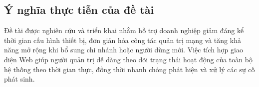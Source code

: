 \subsection{Ý nghĩa thực tiễn của đề tài}
Đề tài được nghiên cứu và triển khai nhằm hỗ trợ doanh nghiệp giảm đáng kể thời gian cấu hình thiết bị, đơn giản hóa công tác quản trị mạng và tăng khả năng mở rộng khi bổ sung chi nhánh hoặc người dùng mới. Việc tích hợp giao diện Web giúp người quản trị dễ dàng theo dõi trạng thái hoạt động của toàn bộ hệ thống theo thời gian thực, đồng thời nhanh chóng phát hiện và xử lý các sự cố phát sinh.